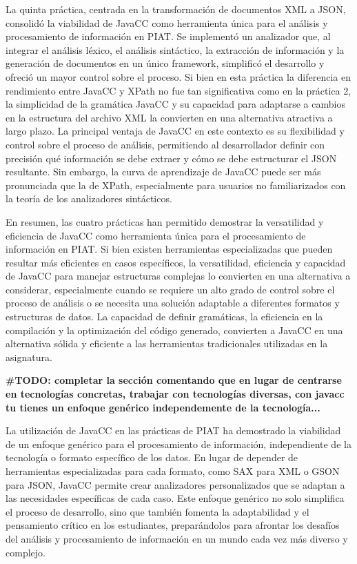 
La quinta práctica, centrada en la transformación de documentos XML a JSON, consolidó la viabilidad de JavaCC como herramienta única para el análisis y procesamiento de información en PIAT. Se implementó un analizador que, al integrar el análisis léxico, el análisis sintáctico, la extracción de información y la generación de documentos en un único framework, simplificó el desarrollo y ofreció un mayor control sobre el proceso. Si bien en esta práctica la diferencia en rendimiento entre JavaCC y XPath no fue tan significativa como en la práctica 2, la simplicidad de la gramática JavaCC y su capacidad para adaptarse a cambios en la estructura del archivo XML la convierten en una alternativa atractiva a largo plazo. La principal ventaja de JavaCC en este contexto es su flexibilidad y control sobre el proceso de análisis, permitiendo al desarrollador definir con precisión qué información se debe extraer y cómo se debe estructurar el JSON resultante. Sin embargo, la curva de aprendizaje de JavaCC puede ser más pronunciada que la de XPath, especialmente para usuarios no familiarizados con la teoría de los analizadores sintácticos.

En resumen, las cuatro prácticas han permitido demostrar la versatilidad y eficiencia de JavaCC como herramienta única para el procesamiento de información en PIAT. Si bien existen herramientas especializadas que pueden resultar más eficientes en casos específicos, la versatilidad, eficiencia y capacidad de JavaCC para manejar estructuras complejas lo convierten en una alternativa a considerar, especialmente cuando se requiere un alto grado de control sobre el proceso de análisis o se necesita una solución adaptable a diferentes formatos y estructuras de datos. La capacidad de definir gramáticas, la eficiencia en la compilación y la optimización del código generado, convierten a JavaCC en una alternativa sólida y eficiente a las herramientas tradicionales utilizadas en la asignatura.


\textbf{\#TODO: completar la sección comentando que en lugar de centrarse en tecnologías concretas, trabajar con tecnologías diversas, con javacc tu tienes un enfoque genérico independemente de la tecnología... }

La utilización de JavaCC en las prácticas de PIAT ha demostrado la viabilidad de un enfoque genérico para el procesamiento de información, independiente de la tecnología o formato específico de los datos. En lugar de depender de herramientas especializadas para cada formato, como SAX para XML o GSON para JSON, JavaCC permite crear analizadores personalizados que se adaptan a las necesidades específicas de cada caso. Este enfoque genérico no solo simplifica el proceso de desarrollo, sino que también fomenta la adaptabilidad y el pensamiento crítico en los estudiantes, preparándolos para afrontar los desafíos del análisis y procesamiento de información en un mundo cada vez más diverso y complejo.

